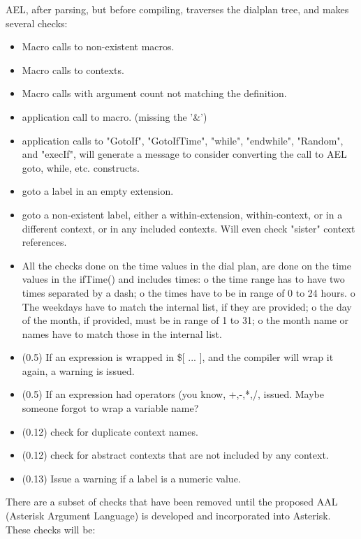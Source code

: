 {AEL, after parsing, but before compiling, traverses the dialplan
tree, and makes several checks:

\begin{itemize}
    \item Macro calls to non-existent macros.
    \item Macro calls to contexts.
    \item Macro calls with argument count not matching the definition.
    \item application call to macro. (missing the '\&')
    \item application calls to "GotoIf", "GotoIfTime", "while",
      "endwhile", "Random", and "execIf", will generate a message to
      consider converting the call to AEL goto, while, etc. constructs.
    \item goto a label in an empty extension.
    \item goto a non-existent label, either a within-extension,
      within-context, or in a different context, or in any included
      contexts. Will even check "sister" context references.
    \item All the checks done on the time values in the dial plan, are
      done on the time values in the ifTime() and includes times:
          o the time range has to have two times separated by a dash;
          o the times have to be in range of 0 to 24 hours.
          o The weekdays have to match the internal list, if they are provided;
          o the day of the month, if provided, must be in range of 1 to 31;
          o the month name or names have to match those in the internal list. 
    \item (0.5) If an expression is wrapped in \$[ ... ], and the compiler
      will wrap it again, a warning is issued.
    \item (0.5) If an expression had operators (you know,
      +,-,*,/,%
      issued. Maybe someone forgot to wrap a variable name?
    \item (0.12) check for duplicate context names.
    \item (0.12) check for abstract contexts that are not included by any context.
    \item (0.13) Issue a warning if a label is a numeric value. 
\end{itemize}

There are a subset of checks that have been removed until the proposed
AAL (Asterisk Argument Language) is developed and incorporated into Asterisk.
These checks will be:

}

